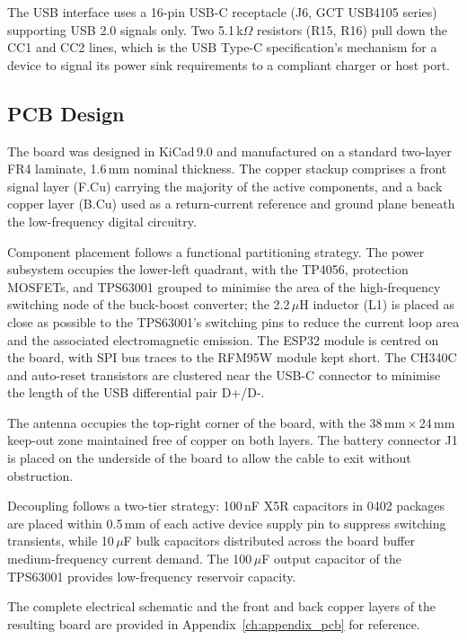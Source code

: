 \documentclass[english,bachelor]{tfgitic}[2026/01/22]
\begin{document}
The USB interface uses a 16-pin USB-C receptacle (J6, GCT USB4105 series) supporting
USB 2.0 signals only. Two 5.1\,k$\Omega$ resistors (R15, R16) pull down the CC1 and
CC2 lines, which is the USB Type-C specification's mechanism for a device to signal
its power sink requirements to a compliant charger or host port.


\subsection{PCB Design}
\label{sec:hw_pcb}

The board was designed in KiCad\,9.0 and manufactured on a standard two-layer FR4
laminate, 1.6\,mm nominal thickness. The copper stackup comprises a front signal
layer (F.Cu) carrying the majority of the active components, and a back copper layer
(B.Cu) used as a return-current reference and ground plane beneath the low-frequency
digital circuitry.

Component placement follows a functional partitioning strategy. The power subsystem
occupies the lower-left quadrant, with the TP4056, protection MOSFETs, and TPS63001
grouped to minimise the area of the high-frequency switching node of the buck-boost
converter; the 2.2\,$\mu$H inductor (L1) is placed as close as possible to the
TPS63001's switching pins to reduce the current loop area and the associated
electromagnetic emission. The ESP32 module is centred on the board, with SPI bus
traces to the RFM95W module kept short. The CH340C and auto-reset transistors are
clustered near the USB-C connector to minimise the length of the USB differential
pair D+/D-.

The antenna occupies the top-right corner of the board, with the 38\,mm\,$\times$\,24\,mm
keep-out zone maintained free of copper on both layers. The battery connector J1 is
placed on the underside of the board to allow the cable to exit without obstruction.

Decoupling follows a two-tier strategy: 100\,nF X5R capacitors in 0402 packages are
placed within 0.5\,mm of each active device supply pin to suppress switching
transients, while 10\,$\mu$F bulk capacitors distributed across the board buffer
medium-frequency current demand. The 100\,$\mu$F output capacitor of the TPS63001
provides low-frequency reservoir capacity.

The complete electrical schematic and the front and back copper layers of the resulting board are provided in Appendix~\ref{ch:appendix_pcb} for reference.
\end{document}
